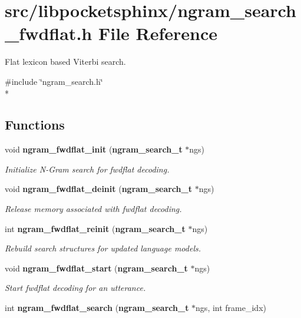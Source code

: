 \section{src/libpocketsphinx/ngram\+\_\+search\+\_\+fwdflat.h File Reference}
\label{ngram__search__fwdflat_8h}


Flat lexicon based Viterbi search.  


{\ttfamily \#include \char`\"{}ngram\+\_\+search.\+h\char`\"{}}\\*
\subsection*{Functions}
\begin{DoxyCompactItemize}
\item 
void {\bf ngram\+\_\+fwdflat\+\_\+init} ({\bf ngram\+\_\+search\+\_\+t} $\ast$ngs)\label{ngram__search__fwdflat_8h_ad4b8ebd904c77f8a28f59cd5ca2c8307}

\begin{DoxyCompactList}\small\item\em Initialize N-\/\+Gram search for fwdflat decoding. \end{DoxyCompactList}\item 
void {\bf ngram\+\_\+fwdflat\+\_\+deinit} ({\bf ngram\+\_\+search\+\_\+t} $\ast$ngs)\label{ngram__search__fwdflat_8h_a8faf467f90162a7273b23304fc6e8586}

\begin{DoxyCompactList}\small\item\em Release memory associated with fwdflat decoding. \end{DoxyCompactList}\item 
int {\bf ngram\+\_\+fwdflat\+\_\+reinit} ({\bf ngram\+\_\+search\+\_\+t} $\ast$ngs)\label{ngram__search__fwdflat_8h_aa4879c06ddbc455a6f355084a9c574b4}

\begin{DoxyCompactList}\small\item\em Rebuild search structures for updated language models. \end{DoxyCompactList}\item 
void {\bf ngram\+\_\+fwdflat\+\_\+start} ({\bf ngram\+\_\+search\+\_\+t} $\ast$ngs)\label{ngram__search__fwdflat_8h_a763c2c7aaa5d7f9c5107af73552a2149}

\begin{DoxyCompactList}\small\item\em Start fwdflat decoding for an utterance. \end{DoxyCompactList}\item 
int {\bf ngram\+\_\+fwdflat\+\_\+search} ({\bf ngram\+\_\+search\+\_\+t} $\ast$ngs, int frame\+\_\+idx)\label{ngram__search__fwdflat_8h_ae77ef21ae92dbcc4b14f40469fbd4307}


\end{DoxyCompactItemize}
